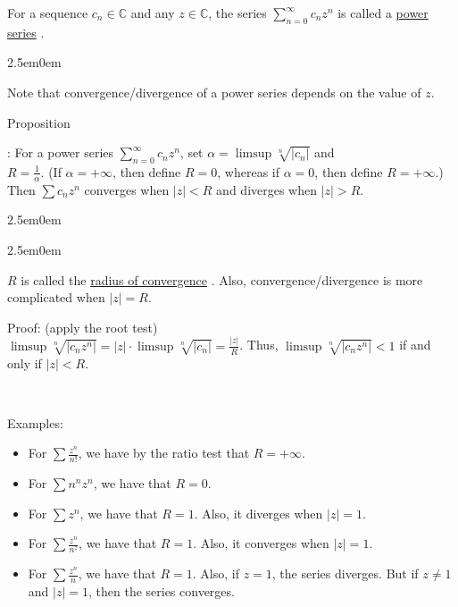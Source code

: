 \documentclass{book}
\newcommand{\hTwo}{%
   \color{MidnightBlue}%
   \fontsize{13}{15}\selectfont%
}
\newcommand{\hThree}{%
   \color{PineGreen}
   \fontsize{13}{15}\selectfont%
}
\newcommand{\exOne}{%
   \color{Purple}%
   \fontsize{14}{16}\selectfont%
}
\newenvironment{myIndent}{%
   \begin{adjustwidth}{2.5em}{0em}%
}{%
   \end{adjustwidth}%
}
\newcommand{\udefine}[1]{%
   \setulcolor{Red}%
   \setul{0.14em}{0.07em}%
   \ul{#1}%
}
\newcommand{\retTwo}{\hfill\bigbreak}
\newcounter{PropNumber}
\newcommand{\propCount}[1][1]{%
   \addtocounter{PropNumber}{#1}%
   \thePropNumber%
}
\newcommand{\mySepTwo}[1][.]{%
   {\noindent\color{#1}{\rule{6.5in}{0.5mm}}}\\%
}
\begin{document}
      \newpage

      For a sequence $c_n \in \mathbb{C}$ and any $z \in \mathbb{C}$, the series $\sum\limits_{n=0}^\infty{c_nz^n}$ is called a \udefine{power series}. \retTwo

      {\begin{myIndent} \hTwo
         Note that convergence/divergence of a power series depends on the value of $z$. \\ [-2pt] \retTwo

         Proposition \propCount: For a power series $\sum\limits_{n=0}^\infty{c_nz^n}$, set $\alpha = \limsup{\sqrt[n]{|c_n|}}$ and\\ $R = \frac{1}{\alpha}$. (If $\alpha = +\infty$, then define $R = 0$, whereas if $\alpha = 0$, then define $R = +\infty$.)\\ [5pt]
         Then $\sum{c_nz^n}$ converges when $|z| < R$ and diverges when $|z| > R$. \\ [-10pt]
         {\begin{myIndent}\begin{myIndent}
            $R$ is called the \udefine{radius of convergence}. Also, convergence/divergence is more complicated when $|z| = R$.
            \end{myIndent} \retTwo\hThree

            Proof: (apply the root test)\\
            $\limsup{\sqrt[n]{|c_nz^n|}} = |z|\cdot\limsup{\sqrt[n]{|c_n|}} = \frac{|z|}{R}$. Thus, $\limsup{\sqrt[n]{|c_nz^n|}} < 1$ if and only if $|z| < R$. \retTwo
         \end{myIndent}}
      \end{myIndent}}
      
   \mySepTwo[Purple]

   {\exOne
   Examples:
   \begin{itemize}
      \item For $\sum{\frac{z^n}{n!}}$, we have by the ratio test that $R = +\infty$.
      \item For $\sum{n^nz^n}$, we have that $R = 0$.
      \item For $\sum{z^n}$, we have that $R = 1$. Also, it diverges when $|z| = 1$.
      \item For $\sum{\frac{z^n}{n^z}}$, we have that $R = 1$. Also, it converges when $|z| = 1$.
      \item For $\sum{\frac{z^n}{n}}$, we have that $R = 1$. Also, if $z = 1$, the series diverges. But if $z \neq 1$ and $|z| = 1$, then the series converges.
   \end{itemize}
   }
\end{document}
